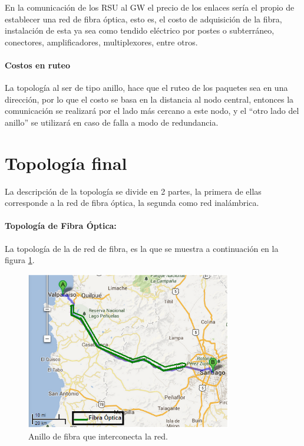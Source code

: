 \documentclass[12pt]{article}
\begin{document}
En la comunicación de los RSU al GW el precio de los enlaces sería el propio de establecer una red de 
fibra óptica, esto es, el costo de adquisición de la fibra, instalación de esta ya sea como tendido 
eléctrico por postes o subterráneo, conectores, amplificadores, multiplexores, entre otros.

\paragraph{Costos en ruteo}

La topología al ser de tipo anillo, hace que el ruteo de los paquetes sea en una dirección, por lo que 
el costo se basa en la distancia al nodo central, entonces la comunicación se realizará por el lado más 
cercano a este nodo, y el ``otro lado del anillo'' se utilizará en caso de falla a modo de redundancia.\\ 

\newpage
\section{Topología final}
La descripción de la topología se divide en 2 partes, la primera de ellas corresponde a la red de fibra 
óptica, la segunda como red inalámbrica.
\paragraph{Topología de Fibra Óptica:}
La topología de la de red de fibra, es la que se muestra a continuación en la figura \ref{fig:anillo_FO}.
\begin{figure}[H]
  \centering
      \includegraphics[width=0.8\textwidth]{anillo_FO}
	    \caption{Anillo de fibra que interconecta la red.}
	\label{fig:anillo_FO}
\end{figure}
\ \\
\end{document}
